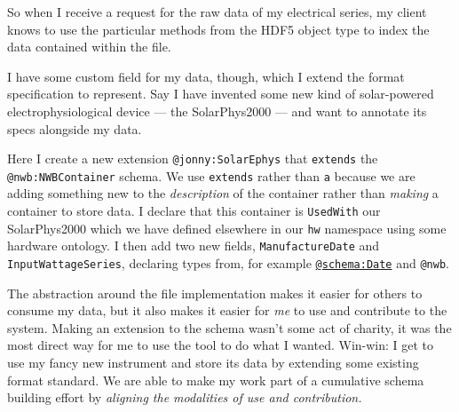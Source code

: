 \begin{Shaded}
\begin{Highlighting}[]
\end{Highlighting}
\end{Shaded}

So when I receive a request for the raw data of my electrical series, my
client knows to use the particular methods from the HDF5 object type to
index the data contained within the file.

I have some custom field for my data, though, which I extend the format
specification to represent. Say I have invented some new kind of
solar-powered electrophysiological device --- the SolarPhys2000 --- and
want to annotate its specs alongside my data.

\begin{Shaded}
\begin{Highlighting}[]
    



\end{Highlighting}
\end{Shaded}

Here I create a new extension \texttt{@jonny:SolarEphys} that
\texttt{extends} the \texttt{@nwb:NWBContainer} schema. We use
\texttt{extends} rather than \texttt{a} because we are adding something
new to the \emph{description} of the container rather than \emph{making}
a container to store data. I declare that this container is
\texttt{UsedWith} our SolarPhys2000 which we have defined elsewhere in
our \texttt{hw} namespace using some hardware ontology. I then add two
new fields, \texttt{ManufactureDate} and \texttt{InputWattageSeries},
declaring types from, for example
\href{https://schema.org/Date}{\texttt{@schema:Date}} and \texttt{@nwb}.

The abstraction around the file implementation makes it easier for
others to consume my data, but it also makes it easier for \emph{me} to
use and contribute to the system. Making an extension to the schema
wasn't some act of charity, it was the most direct way for me to use the
tool to do what I wanted. Win-win: I get to use my fancy new instrument
and store its data by extending some existing format standard. We are
able to make my work part of a cumulative schema building effort by
\emph{aligning the modalities of use and contribution.}

